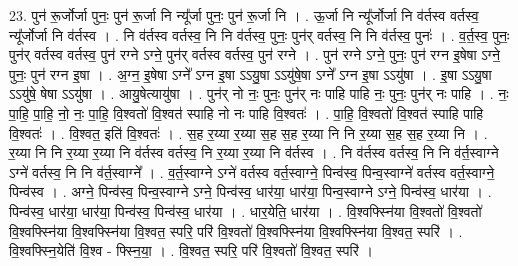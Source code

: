 \documentclass[17pt]{extarticle}
\begin{document}
23. पुन॑ रू॒र्जोर्जा पुनः॒ पुन॑ रू॒र्जा नि न्यू᳚र्जा पुनः॒ पुन॑ रू॒र्जा नि । . ऊ॒र्जा नि न्यू᳚र्जोर्जा नि व॑र्तस्व वर्तस्व॒ न्यू᳚र्जोर्जा नि व॑र्तस्व । . नि व॑र्तस्व वर्तस्व॒ नि नि व॑र्तस्व॒ पुनः॒ पुन॑र् वर्तस्व॒ नि नि व॑र्तस्व॒ पुनः॑ । . व॒र्त॒स्व॒ पुनः॒ पुन॑र् वर्तस्व वर्तस्व॒ पुन॑ रग्ने ऽग्ने॒ पुन॑र् वर्तस्व वर्तस्व॒ पुन॑ रग्ने । . पुन॑ रग्ने ऽग्ने॒ पुनः॒ पुन॑ रग्न इ॒षेषा ऽग्ने॒ पुनः॒ पुन॑ रग्न इ॒षा । . अ॒ग्न॒ इ॒षेषा ऽग्ने᳚ ऽग्न इ॒षा ऽऽयु॒षा ऽऽयु॑षे॒षा ऽग्ने᳚ ऽग्न इ॒षा ऽऽयु॑षा । . इ॒षा ऽऽयु॒षा ऽऽयु॑षे॒ षेषा ऽऽयु॑षा । . आयु॒षेत्यायु॑षा । . पुन॑र् नो नः॒ पुनः॒ पुन॑र् नः पाहि पाहि नः॒ पुनः॒ पुन॑र् नः पाहि । . नः॒ पा॒हि॒ पा॒हि॒ नो॒ नः॒ पा॒हि॒ वि॒श्वतो॑ वि॒श्वत॑ स्पाहि नो नः पाहि वि॒श्वतः॑ । . पा॒हि॒ वि॒श्वतो॑ वि॒श्वत॑ स्पाहि पाहि वि॒श्वतः॑ । . वि॒श्वत॒ इति॑ वि॒श्वतः॑ । . स॒ह र॒य्या र॒य्या स॒ह स॒ह र॒य्या नि नि र॒य्या स॒ह स॒ह र॒य्या नि । . र॒य्या नि नि र॒य्या र॒य्या नि व॑र्तस्व वर्तस्व॒ नि र॒य्या र॒य्या नि व॑र्तस्व । . नि व॑र्तस्व वर्तस्व॒ नि नि व॑र्त॒स्वाग्ने ऽग्ने॑ वर्तस्व॒ नि नि व॑र्त॒स्वाग्ने᳚ । . व॒र्त॒स्वाग्ने ऽग्ने॑ वर्तस्व वर्त॒स्वाग्ने॒ पिन्व॑स्व॒ पिन्व॒स्वाग्ने॑ वर्तस्व वर्त॒स्वाग्ने॒ पिन्व॑स्व । . अग्ने॒ पिन्व॑स्व॒ पिन्व॒स्वाग्ने ऽग्ने॒ पिन्व॑स्व॒ धार॑या॒ धार॑या॒ पिन्व॒स्वाग्ने ऽग्ने॒ पिन्व॑स्व॒ धार॑या । . पिन्व॑स्व॒ धार॑या॒ धार॑या॒ पिन्व॑स्व॒ पिन्व॑स्व॒ धार॑या । . धार॒येति॒ धार॑या । . वि॒श्वफ्स्नि॑या वि॒श्वतो॑ वि॒श्वतो॑ वि॒श्वफ्स्नि॑या वि॒श्वफ्स्नि॑या वि॒श्वत॒ स्परि॒ परि॑ वि॒श्वतो॑ वि॒श्वफ्स्नि॑या वि॒श्वफ्स्नि॑या वि॒श्वत॒ स्परि॑ । . वि॒श्वफ्स्नि॒येति॑ वि॒श्व - फ्स्नि॒या॒ । . वि॒श्वत॒ स्परि॒ परि॑ वि॒श्वतो॑ वि॒श्वत॒ स्परि॑ । \newline
\end{document}
